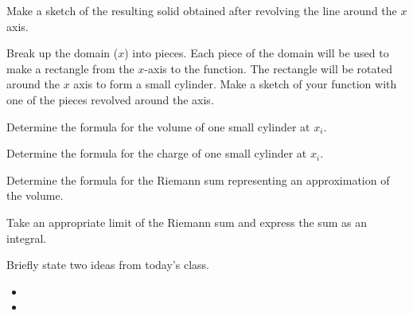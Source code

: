 \begin{problem}
\begin{subproblem}
       \item Make a sketch of the resulting solid obtained after
         revolving the line around the $x$ axis.
         \vfill

       \item Break up the domain ($x$) into pieces. Each piece of the domain will be used to make a rectangle
            from the $x$-axis to the function. The rectangle will be rotated around the $x$ axis to form a small cylinder.
            Make a sketch of your function with one of the pieces revolved around the axis.
         \vfill

       \clearpage

       \item Determine the formula for the volume of one small cylinder at $x_i$.
         \vfill

       \item Determine the formula for the charge of one small cylinder at $x_i$.
         \vfill

       \item Determine the formula for the Riemann sum representing an approximation of the volume.
         \vfill

       \item Take an appropriate limit of the Riemann sum and express the sum as an integral.
         \vfill

     \end{subproblem}

\end{problem}

\postClass

\begin{problem}
\item Briefly state two ideas from today's class.
  \begin{itemize}
  \item
  \item
  \end{itemize}
\item
  \begin{subproblem}
    \item
  \end{subproblem}
\end{problem}



